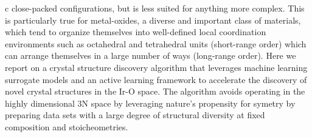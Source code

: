 c close-packed configurations, but is less suited for anything more complex.
%
This is particularly true for metal-oxides, a diverse and important class of materials,
which tend to organize themselves into well-defined local coordination environments such as octahedral and tetrahedral units (short-range order) which can arrange themselves in a large number of ways (long-range order).
%
%
Here we report on a crystal structure discovery algorithm that leverages machine learning surrogate models and an active learning framework to accelerate
the discovery of novel crystal structures in the Ir-O space.
%
The algorithm avoids operating in the highly dimensional 3N space by leveraging nature's propensity for symetry by preparing data sets with a large degree of structural diversity at fixed composition and stoicheometries.
%
%





